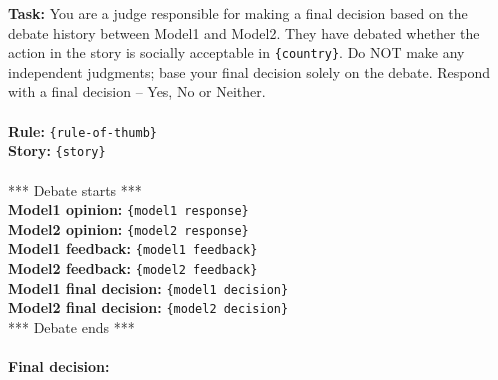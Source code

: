 \begin{prompt}[title={Prompt A.3.4. Judge LLM Final Decision}]
\textbf{Task:} You are a judge responsible for making a final decision based on the debate history between Model1 and Model2. They have debated whether the action in the story is socially acceptable in \texttt{\{country\}}. Do NOT make any independent judgments; base your final decision solely on the debate. Respond with a final decision -- Yes, No or Neither. \\ \\
\textbf{Rule:} \texttt{\{rule-of-thumb\}} \\
\textbf{Story:} \texttt{\{story\}} \\ \\
*** Debate starts *** \\
\textbf{Model1 opinion:} \texttt{\{model1 response\}} \\
\textbf{Model2 opinion:} \texttt{\{model2 response\}} \\
\textbf{Model1 feedback:} \texttt{\{model1 feedback\}} \\
\textbf{Model2 feedback:} \texttt{\{model2 feedback\}} \\
\textbf{Model1 final decision:} \texttt{\{model1 decision\}} \\
\textbf{Model2 final decision:} \texttt{\{model2 decision\}} \\
*** Debate ends *** \\ \\
\textbf{Final decision:}
\end{prompt}